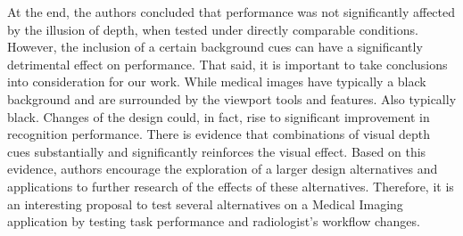 \clearpage

At the end, the authors concluded that performance was not significantly affected by the illusion of depth, when tested under directly comparable conditions. However, the inclusion of a certain background cues can have a significantly detrimental effect on performance. That said, it is important to take conclusions into consideration for our work. While medical images have typically a black background and are surrounded by the viewport tools and features. Also typically black. Changes of the design could, in fact, rise to significant improvement in recognition performance. There is evidence that combinations of visual depth cues substantially and significantly reinforces the visual effect. Based on this evidence, authors encourage the exploration of a larger design alternatives and applications to further research of the effects of these alternatives. Therefore, it is an interesting proposal to test several alternatives on a Medical Imaging application by testing task performance and radiologist's workflow changes.